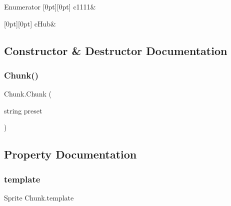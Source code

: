 \begin{DoxyEnumFields}{Enumerator}
[0pt][0pt]{}\mbox{\label{class_chunk_ab2e9c44541a726c19e8f0afbcf82894ca9e8ec7bc0f7942c2c9bc32bfbbd3b591}} 
c1111&\\
\hline

[0pt][0pt]{}\mbox{\label{class_chunk_ab2e9c44541a726c19e8f0afbcf82894ca7c5516c9c767eb37d179548e7e42eee8}} 
c\+Hub&\\
\hline

\end{DoxyEnumFields}


\subsection{Constructor \& Destructor Documentation}
\mbox{\label{class_chunk_a2cf36203919b3a5512c2dd5dc60c446b}} 
\subsubsection{\texorpdfstring{Chunk()}{Chunk()}}
{\footnotesize\ttfamily Chunk.\+Chunk (\begin{DoxyParamCaption}\item[{string}]{preset }\end{DoxyParamCaption})}



\subsection{Property Documentation}
\mbox{\label{class_chunk_a90851ff2883364a1e00753d1fd35461b}} 
\subsubsection{\texorpdfstring{template}{template}}
{\footnotesize\ttfamily Sprite Chunk.\+template\hspace{0.3cm}{\ttfamily [get]}}

